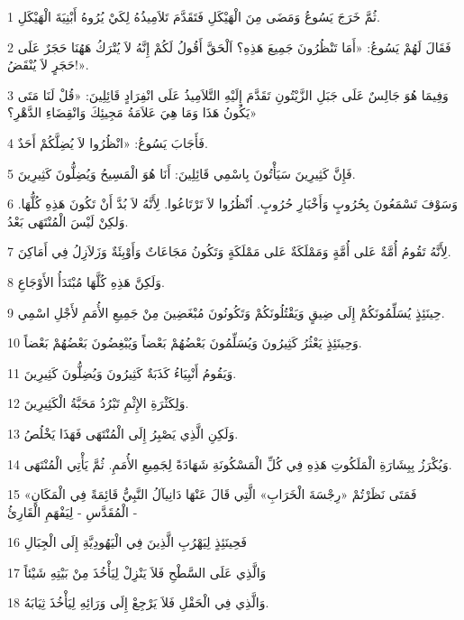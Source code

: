 \par 1 ثُمَّ خَرَجَ يَسُوعُ وَمَضَى مِنَ الْهَيْكَلِ فَتَقَدَّمَ تَلاَمِيذُهُ لِكَيْ يُرُوهُ أَبْنِيَةَ الْهَيْكَلِ.
\par 2 فَقَالَ لَهُمْ يَسُوعُ: «أَمَا تَنْظُرُونَ جَمِيعَ هَذِهِ؟ اَلْحَقَّ أَقُولُ لَكُمْ إِنَّهُ لاَ يُتْرَكُ هَهُنَا حَجَرٌ عَلَى حَجَرٍ لاَ يُنْقَضُ!».
\par 3 وَفِيمَا هُوَ جَالِسٌ عَلَى جَبَلِ الزَّيْتُونِ تَقَدَّمَ إِلَيْهِ التَّلاَمِيذُ عَلَى انْفِرَادٍ قَائِلِينَ: «قُلْ لَنَا مَتَى يَكُونُ هَذَا وَمَا هِيَ عَلاَمَةُ مَجِيئِكَ وَانْقِضَاءِ الدَّهْرِ؟»
\par 4 فَأَجَابَ يَسُوعُ: «انْظُرُوا لاَ يُضِلَّكُمْ أَحَدٌ.
\par 5 فَإِنَّ كَثِيرِينَ سَيَأْتُونَ بِاسْمِي قَائِلِينَ: أَنَا هُوَ الْمَسِيحُ وَيُضِلُّونَ كَثِيرِينَ.
\par 6 وَسَوْفَ تَسْمَعُونَ بِحُرُوبٍ وَأَخْبَارِ حُرُوبٍ. اُنْظُرُوا لاَ تَرْتَاعُوا. لِأَنَّهُ لاَ بُدَّ أَنْ تَكُونَ هَذِهِ كُلُّهَا. وَلكِنْ لَيْسَ الْمُنْتَهَى بَعْدُ.
\par 7 لِأَنَّهُ تَقُومُ أُمَّةٌ عَلى أُمَّةٍ وَمَمْلَكَةٌ عَلى مَمْلَكَةٍ وَتَكُونُ مَجَاعَاتٌ وَأَوْبِئَةٌ وَزَلاَزِلُ فِي أَمَاكِنَ.
\par 8 وَلَكِنَّ هَذِهِ كُلَّهَا مُبْتَدَأُ الأَوْجَاعِ.
\par 9 حِينَئِذٍ يُسَلِّمُونَكُمْ إِلَى ضِيقٍ وَيَقْتُلُونَكُمْ وَتَكُونُونَ مُبْغَضِينَ مِنْ جَمِيعِ الأُمَمِ لأَجْلِ اسْمِي.
\par 10 وَحِينَئِذٍ يَعْثُرُ كَثِيرُونَ وَيُسَلِّمُونَ بَعْضُهُمْ بَعْضاً وَيُبْغِضُونَ بَعْضُهُمْ بَعْضاً.
\par 11 وَيَقُومُ أَنْبِيَاءُ كَذَبَةٌ كَثِيرُونَ وَيُضِلُّونَ كَثِيرِينَ.
\par 12 وَلِكَثْرَةِ الإِثْمِ تَبْرُدُ مَحَبَّةُ الْكَثِيرِينَ.
\par 13 وَلَكِنِ الَّذِي يَصْبِرُ إِلَى الْمُنْتَهَى فَهَذَا يَخْلُصُ.
\par 14 وَيُكْرَزُ بِبِشَارَةِ الْمَلَكُوتِ هَذِهِ فِي كُلِّ الْمَسْكُونَةِ شَهَادَةً لِجَمِيعِ الأُمَمِ. ثُمَّ يَأْتِي الْمُنْتَهَى.
\par 15 «فَمَتَى نَظَرْتُمْ «رِجْسَةَ الْخَرَابِ» الَّتِي قَالَ عَنْهَا دَانِيآلُ النَّبِيُّ قَائِمَةً فِي الْمَكَانِ الْمُقَدَّسِ - لِيَفْهَمِ الْقَارِئُ -
\par 16 فَحِينَئِذٍ لِيَهْرُبِ الَّذِينَ فِي الْيَهُودِيَّةِ إِلَى الْجِبَالِ
\par 17 وَالَّذِي عَلَى السَّطْحِ فَلاَ يَنْزِلْ لِيَأْخُذَ مِنْ بَيْتِهِ شَيْئاً
\par 18 وَالَّذِي فِي الْحَقْلِ فَلاَ يَرْجِعْ إِلَى وَرَائِهِ لِيَأْخُذَ ثِيَابَهُ.
